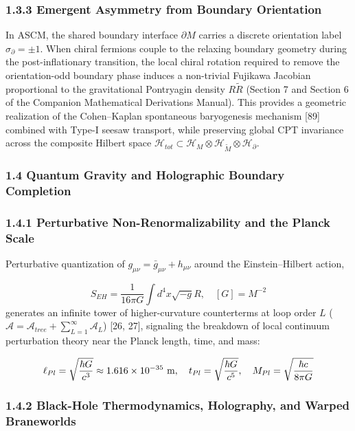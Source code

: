 \documentclass[aps,prd,onecolumn,superscriptaddress,nofootinbib,longbibliography,10pt]{revtex4-2}
\begin{document}
  
\subsubsection*{1.3.3 Emergent Asymmetry from Boundary Orientation}

  In ASCM, the shared boundary interface \(\partial M\) carries a discrete orientation label \(\sigma_\partial = \pm 1\). When chiral fermions couple to the relaxing boundary geometry during the post-inflationary transition, the local chiral rotation required to remove the orientation-odd boundary phase induces a non-trivial Fujikawa Jacobian proportional to the gravitational Pontryagin density \(R\tilde{R}\) (Section 7 and Section 6 of the Companion Mathematical Derivations Manual). This provides a geometric realization of the Cohen–Kaplan spontaneous baryogenesis mechanism [89] combined with Type-I seesaw transport, while preserving global CPT invariance across the composite Hilbert space \(\mathcal{H}_{tot} \subset \mathcal{H}_M \otimes \mathcal{H}_{\tilde{M}} \otimes \mathcal{H}_\partial\).



  
\subsubsection*{1.4 Quantum Gravity and Holographic Boundary Completion}

  
\subsubsection*{1.4.1 Perturbative Non-Renormalizability and the Planck Scale}

  Perturbative quantization of \(g_{\mu\nu} = \bar{g}_{\mu\nu} + h_{\mu\nu}\) around the Einstein–Hilbert action,


  \[ S_{EH} = \frac{1}{16\pi G} \int d^4x \sqrt{-g} R, \quad [G] = M^{-2} \]
  generates an infinite tower of higher-curvature counterterms at loop order \(L\) (\(\mathcal{A} = \mathcal{A}_{tree} + \sum_{L=1}^\infty \mathcal{A}_L\)) [26, 27], signaling the breakdown of local continuum perturbation theory near the Planck length, time, and mass:


  \[ \ell_{Pl} = \sqrt{\frac{\hbar G}{c^3}} \approx 1.616 \times 10^{{\small -35}}\text{ m}, \quad t_{Pl} = \sqrt{\frac{\hbar G}{c^5}}, \quad M_{Pl} = \sqrt{\frac{\hbar c}{8\pi G}} \]
  
\subsubsection*{1.4.2 Black-Hole Thermodynamics, Holography, and Warped Braneworlds}
\end{document}
